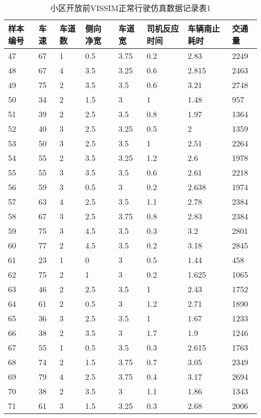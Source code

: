 \begin{table*}[h!]
  \centering
  \small
  \caption{小区开放前VISSIM正常行驶仿真数据记录表1}
\begin{tabular*}{\linewidth}{p{40pt}<{\centering}p{30pt}<{\centering}
p{30pt}<{\centering}p{40pt}<{\centering}p{50pt}<{\centering}p{70pt}<{\centering}
p{60pt}<{\centering}p{50pt}<{\centering}}
\toprule
样本编号 &  车速 & 车道数  & 侧向 净宽 &  车道宽  &  司机反应时间  & 车辆南止耗时  &  交通量  \\
\midrule
47 & 67 & 1 & 0.5 & 3.75 & 0.2 & 2.83 & 2249 \\
48 & 67 & 4 & 3.5 & 3.25 & 0.6 & 2.815 & 2463 \\
49 & 75 & 2 & 3.5 & 3.5 & 0.6 & 3.21 & 2748 \\
50 & 34 & 2 & 1.5 & 3 & 1 & 1.48 & 957 \\
51 & 39 & 2 & 2.5 & 3.5 & 0.8 & 1.97 & 1364 \\
52 & 40 & 3 & 2.5 & 3.25 & 0.5 & 2 & 1359 \\
53 & 50 & 3 & 2.5 & 3.5 & 1 & 2.51 & 2264 \\
54 & 55 & 2 & 3.5 & 3.25 & 1.2 & 2.6 & 1978 \\
55 & 55 & 3 & 3.5 & 3.5 & 0.6 & 2.61 & 2218 \\
56 & 59 & 3 & 0.5 & 3 & 0.2 & 2.638 & 1974 \\
57 & 63 & 4 & 2.5 & 3.5 & 1.1 & 2.78 & 2384 \\
58 & 67 & 3 & 2.5 & 3.75 & 0.8 & 2.83 & 2384 \\
59 & 75 & 3 & 4.5 & 3.5 & 0.3 & 3.2 & 2801 \\
60 & 77 & 2 & 4.5 & 3.5 & 0.2 & 3.18 & 2845 \\
61 & 23 & 1 & 0 & 3 & 0.5 & 1.44 & 458 \\
62 & 75 & 2 & 1 & 3 & 0.2 & 1.625 & 1065 \\
63 & 46 & 2 & 2.5 & 3.5 & 1 & 2.43 & 1752 \\
64 & 61 & 2 & 0.5 & 3 & 1.2 & 2.71 & 1890 \\
65 & 36 & 3 & 2.5 & 3.5 & 1 & 1.67 & 1233 \\
66 & 38 & 2 & 3.5 & 3 & 1.7 & 1.9 & 1246 \\
67 & 55 & 1 & 0.5 & 3.5 & 0.3 & 2.615 & 1763 \\
68 & 74 & 2 & 1.5 & 3.75 & 0.7 & 3.05 & 2349 \\
69 & 79 & 4 & 2.5 & 3.75 & 0.4 & 3.17 & 2694 \\
70 & 38 & 2 & 3.5 & 3 & 1.1 & 1.86 & 1343 \\
71 & 61 & 3 & 1.5 & 3.25 & 0.3 & 2.68 & 2006 \\

\end{tabular*}
\end{table*}
